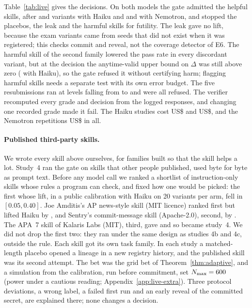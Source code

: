 Table~\ref{tab:live} gives the decisions. On both models the gate admitted the helpful skills, after \NLsHelpN{} and \NLsBHelpN{} variants with Haiku and \NLnHelpN{} and \NLnBHelpN{} with Nemotron, and stopped the placebos, the leak and the harmful skills for futility. The leak gave no lift, because the exam variants came from seeds that did not exist when it was registered; this checks commit and reveal, not the coverage detector of E6. The harmful skill of the second family lowered the pass rate in every discordant variant, but at the decision the anytime-valid upper bound on $\Delta$ was still above zero (\NLsBHarmUcb{} with Haiku), so the gate refused it without certifying harm; flagging harmful skills needs a separate test with its own error budget. The five resubmissions ran at levels falling from \NLsResubLevelFirst{} to \NLsResubLevelLast{} and were all refused. The verifier recomputed every grade and decision from the logged responses, and changing one recorded grade made it fail. The Haiku studies cost US\$\NLsCost{} and US\$\NLsThreeCost, and the Nemotron repetitions US\$\NLnTotalCost{} in all.

\paragraph{Published third-party skills.} We wrote every skill above ourselves, for families built so that the skill helps a lot. Study~4 ran the gate on skills that other people published, used byte for byte as prompt text. Before any model call we ranked a shortlist of instruction-only skills whose rules a program can check, and fixed how one would be picked: the first whose lift, in a public calibration with Haiku on 20 variants per arm, fell in $[0.05,0.40]$. Joe Amditis's AP news-style skill (MIT licence) ranked first but lifted Haiku by \NCalFourBLift, and Sentry's commit-message skill (Apache-2.0), second, by \NCalFourCLift. The APA~7 skill of Kalaris Labs (MIT), third, gave \NCalFourLift{} and so became study~4. We did not drop the first two: they ran under the same design as studies 4b and 4c, outside the rule. Each skill got its own task family. In each study a matched-length placebo opened a lineage in a new registry history, and the published skill was its second attempt. The bet was the grid bet of Theorem~\ref{thm:adaptive}, and a simulation from the calibration, run before commitment, set $N_{\max}=600$ (power \NPowCons{} under a cautious reading; Appendix~\ref{app:live-extra}). Three protocol deviations, a wrong label, a failed first run and an early reveal of the committed secret, are explained there; none changes a decision.


